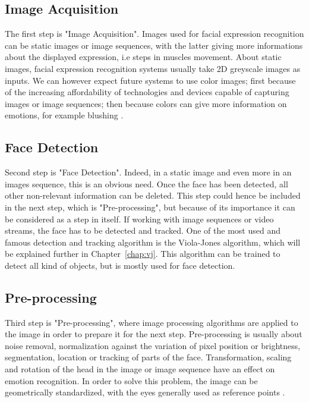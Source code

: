 \subsection{Image Acquisition}

\vspace{\baselineskip}
\noindent The first step is "Image Acquisition". Images used for facial expression recognition can be static images or image sequences, with the latter giving more informations about the displayed expression, i.e steps in muscles movement. About static images, facial expression recognition systems usually take 2D greyscale images as inputs. We can however expect future systems to use color images; first because of the increasing affordability of technologies and devices capable of capturing images or image sequences; then because colors can give more information on emotions, for example blushing \cite{CHI03}.
\newline

\subsection{Face Detection}

\vspace{\baselineskip}
\noindent Second step is "Face Detection". Indeed, in a static image and even more in an images sequence, this is an obvious need. Once the face has been detected, all other non-relevant information can be deleted. This step could hence be included in the next step, which is "Pre-processing", but because of its importance it can be considered as a step in itself. If working with image sequences or video streams, the face has to be detected and tracked. One of the most used and famous detection and tracking algorithm is the Viola-Jones algorithm, which will be explained further in Chapter~\ref{chap:vj}. This algorithm can be trained to detect all kind of objects, but is mostly used for face detection.
\newline

\subsection{Pre-processing}

\vspace{\baselineskip}
\noindent Third step is "Pre-processing", where image processing algorithms are applied to the image in order to prepare it for the next step. Pre-processing is usually about noise removal, normalization against the variation of pixel position or brightness, segmentation, location or tracking of parts of the face. Transformation, scaling and rotation of the head in the image or image sequence have an effect on emotion recognition. In order to solve this problem, the image can be geometrically standardized, with the eyes generally used as reference points \cite{CHI03}.
\newline

